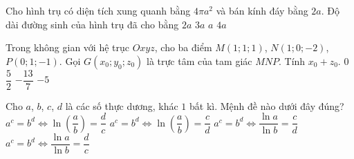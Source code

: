 \begin{ex}%
Cho hình trụ có diện tích xung quanh bằng $4\pi a^2$ và bán kính đáy bằng $2a$. Độ dài đường sinh của hình trụ đã cho bằng
\choice
{$2a$}
{$3a$}
{\True $a$}
{$4a$}
\end{ex}

\begin{ex}%
Trong không gian với hệ trục $Oxyz$, cho ba điểm $M(1;1;1)$, $N(1;0;-2)$, $P(0;1;-1)$. Gọi $G(x_0;y_0;z_0)$ là trực tâm của tam giác $MNP$. Tính $x_0+z_0$.
\choice
{$0$}
{$\dfrac{5}{2}$}
{\True $-\dfrac{13}{7}$}
{$-5$}
\end{ex}

\begin{ex}%
Cho $a$, $b$, $c$, $d$ là các số thực dương, khác $1$ bất kì. Mệnh đề nào dưới đây đúng?
\choice
{$a^c=b^d\Leftrightarrow\ln\left(\dfrac{a}{b}\right)=\dfrac{d}{c}$}
{$a^c=b^d\Leftrightarrow\ln\left(\dfrac{a}{b}\right)=\dfrac{c}{d}$}
{$a^c=b^d\Leftrightarrow\dfrac{\ln a}{\ln b}=\dfrac{c}{d}$}
{\True $a^c=b^d\Leftrightarrow\dfrac{\ln a}{\ln b}=\dfrac{d}{c}$}
\end{ex}


